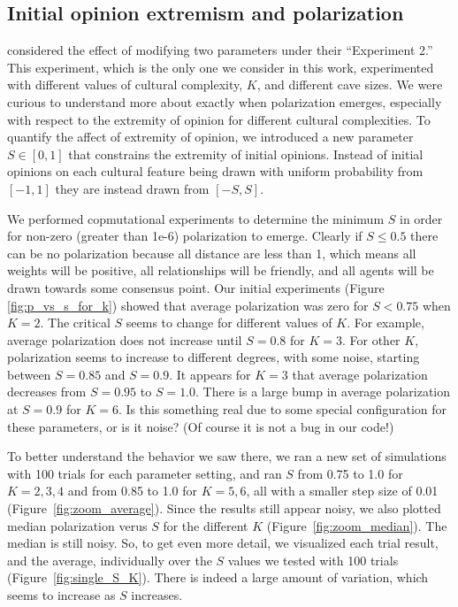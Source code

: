\documentclass[11pt,letterpaper]{article}
\begin{document}
\subsection{Initial opinion extremism and polarization}

 considered the effect of modifying two parameters under their
``Experiment 2.'' This experiment, which is the only one we consider in this
work, experimented with different values of cultural complexity, $K$, and 
different cave sizes. We were curious to understand more about exactly when
polarization emerges, especially with respect to the extremity of opinion
for different cultural complexities. To quantify the affect of extremity of
opinion, we introduced a new parameter $S \in [0, 1]$ that constrains the
extremity of initial opinions. Instead of initial opinions on each
cultural feature being drawn with uniform probability from $[-1, 1]$ they are
instead drawn from $[-S, S]$. 

We performed copmutational experiments to determine the minimum $S$ 
in order for non-zero (greater than 1e-6) polarization to emerge. Clearly if 
$S\leq0.5$ there can be no polarization because all distance are less than 1,
which means all weights will be positive, all
relationships will be friendly, and all agents will be drawn towards some 
consensus point. Our initial experiments (Figure \ref{fig:p_vs_s_for_k})
showed that average polarization was zero for $S < 0.75$ when $K=2$. 
The critical $S$ seems to change for different values of $K$. For example,
average polarization does not increase until $S=0.8$ for $K=3$. For other $K$,
polarization seems to increase to different degrees, with some noise, starting
between $S=0.85$ and $S=0.9$. It appears for $K=3$ that average polarization
decreases from $S=0.95$ to $S=1.0$. There is a large bump in average 
polarization at $S=0.9$ for $K=6$. Is this something real due to some special
configuration for these parameters, or is it noise? (Of course it is not a bug
in our code!)

To better understand the behavior we saw there, we ran a new set of simulations
with 100 trials for each parameter setting, and ran $S$ from 0.75 to 1.0 for
$K=2, 3, 4$ and from 0.85 to 1.0 for $K=5,6$, all with a smaller step size 
of 0.01 (Figure~\ref{fig:zoom_average}). Since the results still appear
noisy, we also plotted median polarization verus $S$ for the different $K$
(Figure~\ref{fig:zoom_median}). The median is still noisy. So, to get even
more detail, we visualized each trial result, and the average, individually
over the $S$ values we tested with 100 trials (Figure~\ref{fig:single_S_K}).
There is indeed a large amount of variation, which seems to increase as $S$
increases.
\end{document}
